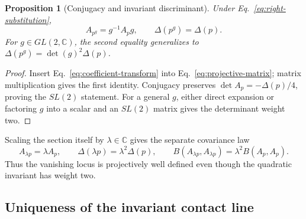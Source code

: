 \documentclass[11pt]{article}
\numberwithin{equation}{section}
\newcommand{\CC}{\mathbb C}
\newtheorem{proposition}[theorem]{Proposition}
\begin{document}
\begin{proposition}[Conjugacy and invariant discriminant]
Under Eq.~\eqref{eq:right-substitution},
\begin{equation}
 A_{p^g}=g^{-1}A_pg,
 \qquad
 \Delta(p^g)=\Delta(p).
 \label{eq:conjugacy}
\end{equation}
For \(g\in GL(2,\CC)\), the second equality generalizes to
\(\Delta(p^g)=\det(g)^2\Delta(p)\).
\end{proposition}

\begin{proof}
Insert Eq.~\eqref{eq:coefficient-transform} into
Eq.~\eqref{eq:projective-matrix}; matrix multiplication gives the first
identity.  Conjugacy preserves \(\det A_p=-\Delta(p)/4\), proving the
\(SL(2)\) statement.  For a general \(g\), either direct expansion or
factoring \(g\) into a scalar and an \(SL(2)\) matrix gives the determinant
weight two.
\end{proof}

Scaling the section itself by \(\lambda\in\CC\) gives the separate covariance
law
\begin{equation}
 A_{\lambda p}=\lambda A_p,
 \qquad \Delta(\lambda p)=\lambda^2\Delta(p),
 \qquad B(A_{\lambda p},A_{\lambda p})=\lambda^2B(A_p,A_p).
 \label{eq:section-scaling}
\end{equation}
Thus the vanishing locus is projectively well defined even though the
quadratic invariant has weight two.

\subsection{Uniqueness of the invariant contact line}
\end{document}
